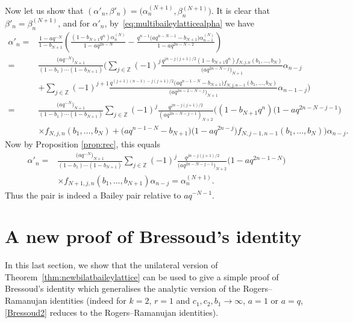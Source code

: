 \documentclass[pdftex]{sigma}
\numberwithin{equation}{section}
\newcommand{\field}[1]{\mathbb{#1}}
\newcommand{\Z}{\field{Z}}
\begin{document}
Now let us show that $(\alpha'_n,\beta'_n) = \bigl(\alpha^{(N+1)}_n,\beta^{(N+1)}_n\bigr)$.
It is clear that $\beta'_n=\beta^{(N+1)}_n$, and for $\alpha'_n$, by~\eqref{eq:multibaileylatticealpha} we have
\begin{align*}
\alpha'_n
={}&\frac{1-aq^{-N}}{1-b_{N+1}}\left(\frac{(1-b_{N+1}q^n) \alpha_n^{(N)}}{1-aq^{2n-N}}-\frac{q^{n-1}\bigl(aq^{n-N-1}-b_{N+1}\bigr) \alpha_{n-1}^{(N)}}{1-aq^{2n-N-2}}\right)\\
={}& \frac{\bigl(aq^{-N}\bigr)_{N+1}}{(1-b_1)\cdots(1-b_{N+1})} \bigg(\sum_{j \in \Z}(-1)^j\frac{q^{jn-j(j+1)/2}(1-b_{N+1}q^n)f_{N,j,n}(b_1,\ldots,b_N)}{\bigl(aq^{2n-N-j}\bigr)_{N+1}} \alpha_{n-j} \\
& +\sum_{j \in \Z}(-1)^{j+1}\frac{q^{(j+1)(n-1)-j(j+1)/2}\bigl(aq^{n-1-N}-b_{N+1}\bigr)f_{N,j,n-1}(b_1,\ldots,b_N)}{\bigl(aq^{2n-2-N-j}\bigr)_{N+1}} \alpha_{n-1-j} \bigg)\\
={}& \frac{\bigl(aq^{-N}\bigr)_{N+1}}{(1-b_1)\cdots(1-b_{N+1})} \sum_{j \in \Z}(-1)^j\frac{q^{jn-j(j+1)/2}}{(aq^{2n-N-j-1})_{N+2}} \big( (1-b_{N+1}q^n)\bigl(1-aq^{2n-N-j-1}\bigr)
\\
& \times f_{N,j,n}(b_1,\ldots,b_N)+ \bigl(aq^{n-1-N}-b_{N+1}\bigr)\bigl(1-aq^{2n-j}\bigr)f_{N,j-1,n-1}(b_1,\ldots,b_N) \big) \alpha_{n-j}.
\end{align*}
Now by Proposition \ref{prop:rec}, this equals
\begin{align*}
\alpha'_n
={}& \frac{\bigl(aq^{-N}\bigr)_{N+1}}{(1-b_1)\cdots(1-b_{N+1})} \sum_{j \in \Z}(-1)^j\frac{q^{jn-j(j+1)/2}}{\bigl(aq^{2n-N-j-1}\bigr)_{N+2}} \bigl(1-aq^{2n-1-N}\bigr)\\
&\times f_{N+1,j,n}(b_1,\ldots,b_{N+1}) \alpha_{n-j}
= \alpha_n^{(N+1)}.
\end{align*}
Thus the pair  is indeed a Bailey pair relative to $aq^{-N-1}$.

\section{A new proof of Bressoud's identity}\label{sec:bressoud}

In this last section, we show that the unilateral version of Theorem~\ref{thm:newbilatbaileylattice} can be used to give a simple proof of Bressoud's identity \cite{Br80} which generalises the analytic version of the Rogers--Ramanujan identities (indeed for $k=2$, $r=1$ and $c_1,c_2,b_1\to\infty$, $a=1$ or $a=q$, \eqref{Bressoud2} reduces to the Rogers--Ramanujan identities).
\end{document}
